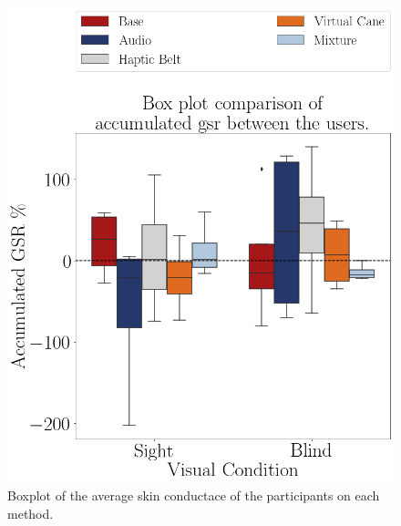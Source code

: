 \begin{figure}[!htb]
    \begin{minipage}{.45\linewidth}
        \centering
        \includegraphics[width = \linewidth]{Resultados/GSR/Figuras/png/boxplot_gsr_sum_scene.png}
        \caption{Boxplot of the average skin conductace of the participants on each method.}
        \label{fig:boxplot_gsr_scene}
    \end{minipage}
    \begin{minipage}{.1\linewidth}
        \hfill
    \end{minipage}
    \begin{minipage}{.45\linewidth}
        \vspace{1.8cm}
        \centering

\end{minipage}
\end{figure}
